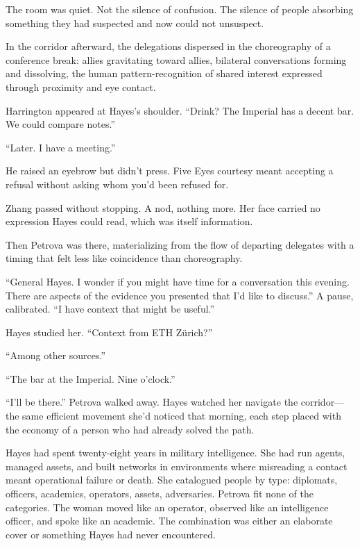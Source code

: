 The room was quiet. Not the silence of confusion. The silence of people absorbing something they had suspected and now could not unsuspect.

\scenebreak

In the corridor afterward, the delegations dispersed in the choreography of a conference break: allies gravitating toward allies, bilateral conversations forming and dissolving, the human pattern-recognition of shared interest expressed through proximity and eye contact.

Harrington appeared at Hayes's shoulder. ``Drink? The Imperial has a decent bar. We could compare notes.''

``Later. I have a meeting.''

He raised an eyebrow but didn't press. Five Eyes courtesy meant accepting a refusal without asking whom you'd been refused for.

Zhang passed without stopping. A nod, nothing more. Her face carried no expression Hayes could read, which was itself information.

Then Petrova was there, materializing from the flow of departing delegates with a timing that felt less like coincidence than choreography.

``General Hayes. I wonder if you might have time for a conversation this evening. There are aspects of the evidence you presented that I'd like to discuss.'' A pause, calibrated. ``I have context that might be useful.''

Hayes studied her. ``Context from ETH Z\"urich?''

``Among other sources.''

``The bar at the Imperial. Nine o'clock.''

``I'll be there.'' Petrova walked away. Hayes watched her navigate the corridor---the same efficient movement she'd noticed that morning, each step placed with the economy of a person who had already solved the path.

Hayes had spent twenty-eight years in military intelligence. She had run agents, managed assets, and built networks in environments where misreading a contact meant operational failure or death. She catalogued people by type: diplomats, officers, academics, operators, assets, adversaries. Petrova fit none of the categories. The woman moved like an operator, observed like an intelligence officer, and spoke like an academic. The combination was either an elaborate cover or something Hayes had never encountered.

